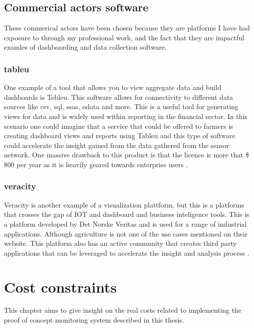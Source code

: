 \documentclass[]{uiophd}
\begin{document}
\section{Commercial actors software}
These commerical actors have been chosen because they are platforms I have had exposure to through my professional work, and the fact that they are impactful examles of dashboarding and data collection software.
\subsection{tableu}
One example of a tool that allows you to view aggregate data and build dashboards is Tebleu. This software allows for connectivity to different data sources like csv, sql, ssas, odata and more. This is a useful tool for generating views for data and is widely used within reporting in the financial sector. In this scenario one could imagine that a service that could be offered to farmers is creating dashboard views and reports using Tableu and  this type of software could accelerate the insight gained from the data gathered from the sensor network. One massive drawback to this product is that the licence is more that \$ 800 per year as it is heavily geared towards enterprise users \cite{tableu}.

\subsection{veracity}
Veracity is another example of a visualization plattform, but this is a platforms that crosses the gap of IOT and dashboard and business inteligence tools. This is a platform developed by Det Norske Veritas and is used for a range of industrial applications. Although agriculture is not one of the use cases mentioned on their website. This platform also has an active community that creates third party applications that can be leveraged to accelerate the insight and analysis process \cite{veracity}.

\chapter{Cost constraints}

This chapter aims to give insight on the real costs related to implementing the proof of concept monitoring system described in this thesis.
\end{document}

